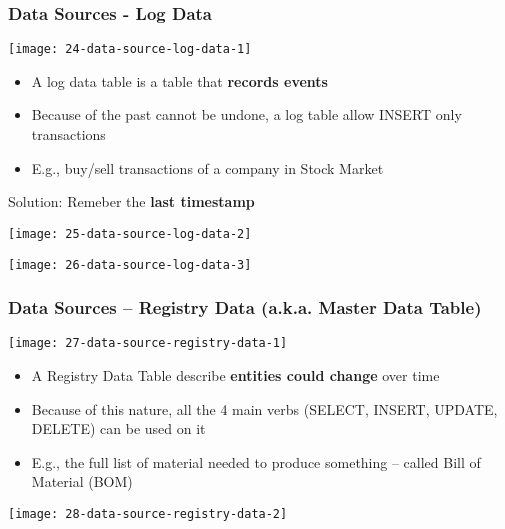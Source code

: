 \subsubsection{Data Sources - Log Data}

\begin{center}
\texttt{[image: 24-data-source-log-data-1]}
\end{center}

\begin{itemize}
	\item A log data table is a table that \textbf{records events}
	\item Because of the past cannot be undone, a log table allow INSERT only transactions
	\item E.g., buy/sell transactions of a company in Stock Market
\end{itemize}

Solution: Remeber the \textbf{last timestamp}

\hrulefill

\begin{center}
\texttt{[image: 25-data-source-log-data-2]}
\end{center}

\begin{center}
\texttt{[image: 26-data-source-log-data-3]}
\end{center}

\hrulefill

\subsubsection{Data Sources – Registry Data (a.k.a. Master Data Table)}

\begin{center}
\texttt{[image: 27-data-source-registry-data-1]}
\end{center}

\begin{itemize}
	\item A Registry Data Table describe \textbf{entities could change} over
time
	\item Because of this nature, all the 4 main verbs (SELECT,
INSERT, UPDATE, DELETE) can be used on it
	\item E.g., the full list of material needed to produce something
– called Bill of Material (BOM)
\end{itemize}

\begin{center}
\texttt{[image: 28-data-source-registry-data-2]}
\end{center}

